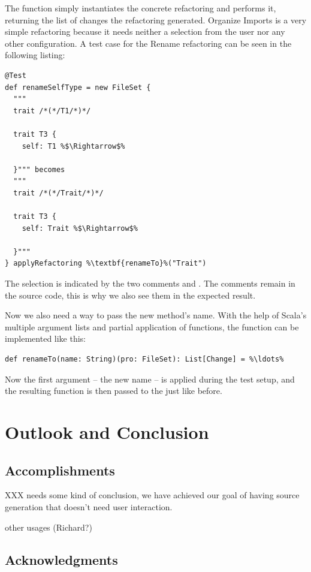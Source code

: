 \documentclass[10pt,a4paper,oneside]{scrreprt}
\begin{document}
The  function simply instantiates the concrete refactoring and performs it, returning the list of changes the refactoring generated. Organize Imports is a very simple refactoring because it needs neither a selection from the user nor any other configuration. A test case for the Rename refactoring can be seen in the following listing:

\begin{lstlisting}
@Test
def renameSelfType = new FileSet {
  """
  trait /*(*/T1/*)*/

  trait T3 {
    self: T1 %$\Rightarrow$%

  }""" becomes
  """
  trait /*(*/Trait/*)*/

  trait T3 {
    self: Trait %$\Rightarrow$%

  }"""
} applyRefactoring %\textbf{renameTo}%("Trait")
\end{lstlisting}

The selection is indicated by the two comments \src{/*(*/} and \src{/*)*/}. The comments remain in the source code, this is why we also see them in the expected result. 

Now we also need a way to pass the new method's name. With the help of Scala's multiple argument lists and partial application of functions, the  function can be implemented like this:

\begin{lstlisting}
def renameTo(name: String)(pro: FileSet): List[Change] = %\ldots%
\end{lstlisting}

Now the first argument -- the new name -- is applied during the test setup, and the resulting function is then passed to the  just like before.

\chapter{Outlook and Conclusion} \label{chapter:outlook}

\section{Accomplishments}

XXX needs some kind of conclusion, we have achieved our goal of having source generation that doesn't need user interaction.

other usages (Richard?)


\section{Acknowledgments}
\end{document}
